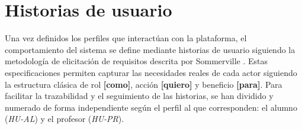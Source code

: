\section{Historias de usuario}\label{sec:historias_de_usuario}

Una vez definidos los perfiles que interactúan con la plataforma, el comportamiento del sistema se define mediante historias de usuario siguiendo la metodología de elicitación de requisitos descrita por Sommerville \cite{sommerville2021engineering}. Estas especificaciones permiten capturar las necesidades reales de cada actor siguiendo la estructura clásica de rol \textbf{[como]}, acción \textbf{[quiero]} y beneficio \textbf{[para]}. Para facilitar la trazabilidad y el seguimiento de las historias, se han dividido y numerado de forma independiente según el perfil al que corresponden: el alumno (\textit{HU-AL}) y el profesor (\textit{HU-PR}).

